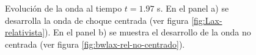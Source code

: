 \documentclass[12pt,a4paper]{book}
\begin{document}
\begin{figure}[H] 
\centering
{}
\caption{Evolución de la onda al tiempo $t = 1.97$ s. En el panel a) se desarrolla la onda de choque centrada (ver figura \ref{fig:Lax-relativista}). En el panel b) se muestra el desarrollo de la onda no centrada (ver figura \ref{fig:bwlax-rel-no-centrado}).} \label{fig:Lax-relativista-t-1.97}
\end{figure}
\end{document}
